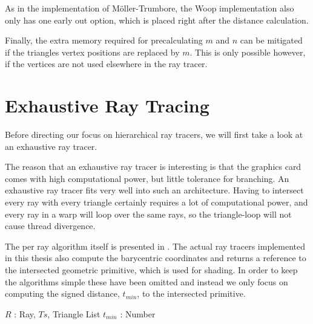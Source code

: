 
As in the implementation of Möller-Trumbore, the Woop implementation
also only has one early out option, which is placed right after the
distance calculation.


Finally, the extra memory required for precalculating $m$ and $n$ can
be mitigated if the triangles vertex positions are replaced by
$m$. This is only possible however, if the vertices are not used
elsewhere in the ray tracer.


\section{Exhaustive Ray Tracing} \label{sec:exhaustive}

Before directing our focus on hierarchical ray tracers, we will first
take a look at an exhaustive ray tracer.


The reason that an exhaustive ray tracer is interesting is that the
graphics card comes with high computational power, but little
tolerance for branching. An exhaustive ray tracer fits very well into
such an architecture. Having to intersect every ray with every
triangle certainly requires a lot of computational power, and every
ray in a warp will loop over the same rays, so the triangle-loop will
not cause thread divergence.


The per ray algorithm itself is presented in
. The actual ray tracers implemented in this
thesis also compute the barycentric coordinates and returns a
reference to the intersected geometric primitive, which is used for
shading. In order to keep the algorithms simple these have been
omitted and instead we only focus on computing the signed distance,
$t_{min}$, to the intersected primitive.

\begin{algorithm}
  \caption{Exhaustive ray tracer}
  \label{alg:exhaustive}
  \begin{algorithmic}
              {$R$ : Ray, $Ts$, Triangle List}
              {$t_{min}$ : Number}{
                \ENDFOR
              }
  \end{algorithmic}
\end{algorithm}

